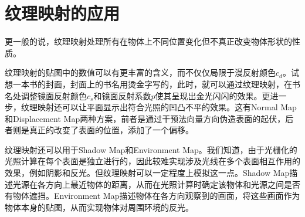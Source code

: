 \section{纹理映射的应用}
更一般的说，纹理映射处理所有在物体上不同位置变化但不真正改变物体形状的性质。

纹理映射的贴图中的数值可以有更丰富的含义，而不仅仅局限于漫反射颜色$c_d$。试想一本书的封面，封面上的书名用烫金字写的，此时，就可以通过纹理映射，在书名处调整镜面反射颜色$c_s$和镜面反射系数$p$使其呈现出金光闪闪的效果。更进一步，纹理映射还可以让平面显示出符合光照的凹凸不平的效果。这有Normal Map和Displacement Map两种方案，前者是通过干预法向量方向伪造表面的起伏，后者则是真正的改变了表面的位置，添加了一个偏移。

纹理映射还可以用于Shadow Map和Environment Map。我们知道，由于光栅化的光照计算在每个表面是独立进行的，因此较难实现涉及光线在多个表面相互作用的效果，例如阴影和反光。但纹理映射可以一定程度上模拟这一点。Shadow Map描述光源在各方向上最近物体的距离，从而在光照计算时确定该物体和光源之间是否有物体遮挡。Environment Map描述物体在各方向观察到的画面，将这些画面作为物体本身的贴图，从而实现物体对周围环境的反光。

